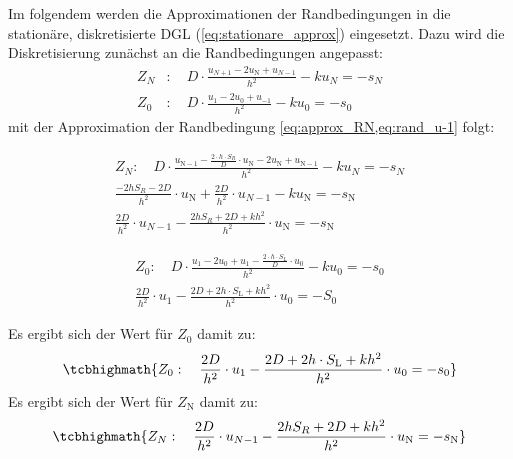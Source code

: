 Im folgendem werden die Approximationen der Randbedingungen in die stationäre,
diskretisierte DGL (\cref{eq:stationare_approx}) eingesetzt. Dazu wird die
Diskretisierung zunächst an die Randbedingungen angepasst:
\begin{equation}
	\begin{split}
		Z_N&: \quad	D\cdot
		\frac{u_{N+1}-2u_\mathrm{N}+u_{N-1}}{h^2}-ku_N=-s_N \\
		Z_0&: \quad D\cdot \frac{u_{1}-2u_0+u_{-1}}{h^2}-ku_0=-s_0
	\end{split}
\end{equation}
mit der Approximation der Randbedingung \cref{eq:approx_RN,eq:rand_u-1} folgt:

\begin{equation}
	\begin{split}
		Z_N: \quad	D\cdot
		\frac{u_{\mathrm{N}-1}-\frac{2\cdot h\cdot S_R}{D} \cdot u_\mathrm{N}
		-2u_\mathrm{N}+u_{\mathrm{N}-1}}{h^2}-ku_N=-s_N \\
		\frac{-2hS_R-2D}{h^2}\cdot
		u_\mathrm{N}+\frac{2D}{h^2}\cdot u_{N-1}-ku_\mathrm{N}=-s_\mathrm{N}\\
		\frac{2D}{h^2}\cdot
		u_{N-1}-\frac{2hS_R+2D+kh^2}{h^2}\cdot u_\mathrm{N}=-s_\mathrm{N}
	\end{split}
\end{equation}

\begin{equation}
	\begin{split}
		Z_0: \quad	D\cdot \frac{u_1-2u_0+u_1-\frac{2\cdot h\cdot
				S_L}{D} \cdot u_0 }{h^2}-ku_0=-s_0\\
		\frac{2D}{h^2}\cdot u_1 - \frac{2D+2h\cdot
			S_\mathrm{L}+kh^2}{h^2}\cdot u_0=-S_0
	\end{split}
\end{equation}

\begin{qed}
	Es ergibt sich der Wert für $Z_0$ damit zu:
	\begin{equation}
		\tcbhighmath{Z_0: \quad \frac{2D}{h^2}\cdot u_1 -
			\frac{2D+2h\cdot S_\mathrm{L}+kh^2}{h^2}\cdot u_0=-s_0}
	\end{equation}
	Es ergibt sich der Wert für $Z_\mathrm{N}$ damit zu:
	\begin{equation}
		\tcbhighmath{Z_N: \quad \frac{2D}{h^2}\cdot
			u_{N-1}-\frac{2hS_R+2D+kh^2}{h^2}\cdot u_\mathrm{N}=-s_\mathrm{N}}
	\end{equation}

\end{qed}

